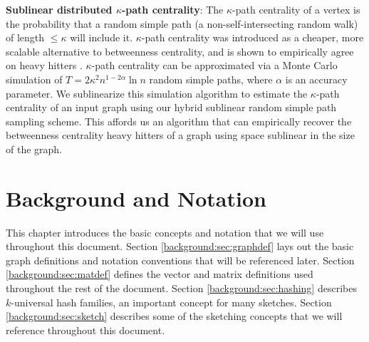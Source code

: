 \documentclass{report}
\begin{document}
\noindent
\textbf{Sublinear distributed $\kappa$-path centrality}:
The $\kappa$-path centrality of a vertex is the probability that a random simple path (a non-self-intersecting random walk) of length $\leq \kappa$ will include it.
$\kappa$-path centrality was introduced as a cheaper, more scalable alternative to betweenness centrality, and is shown to empirically agree on heavy hitters \cite{kourtellis2013identifying}.
$\kappa$-path centrality can be approximated via a Monte Carlo simulation of $T = 2 \kappa^2 n^{1-2\alpha} \ln n$ random simple paths, where $\alpha$ is an accuracy parameter. 
We sublinearize this simulation algorithm to estimate the $\kappa$-path centrality of an input graph using our hybrid sublinear random simple path sampling scheme. 
This affords us an algorithm that can empirically recover the betweenness centrality heavy hitters of a graph using space sublinear in the size of the graph.  





\chapter{Background and Notation} \label{chap:background}

This chapter introduces the basic concepts and notation that we will use throughout this document.
Section \ref{background:sec:graphdef} lays out the basic graph definitions and notation conventions that will be referenced later. 
Section \ref{background:sec:matdef} defines the vector and matrix definitions used throughout the rest of the document. 
Section \ref{background:sec:hashing} describes $k$-universal hash families, an important concept for many sketches.
Section \ref{background:sec:sketch} describes some of the sketching concepts that we will reference throughout this document.
\end{document}
